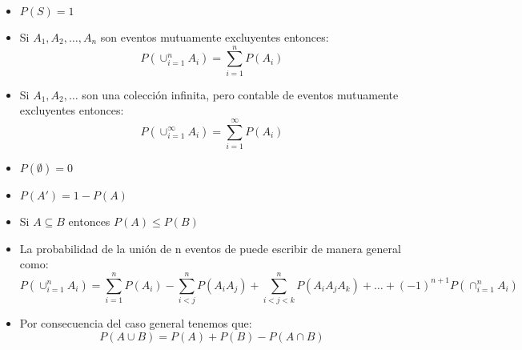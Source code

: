 \documentclass[12pt, fleqn]{report}                             %
\theoremstyle{break}                                            %
\newcommand{\Wrap}[1]{\left( #1 \right)}                        %
\begin{document}
            \begin{itemize}
                \item
                    $P(S) = 1$
                
                \item
                    Si $A_1, A_2, \dots, A_n$ son eventos mutuamente excluyentes entonces:
                    \begin{equation*}
                        P\Wrap{\cup_{i = 1}^n A_i} 
                            = \sum_{i = 1}^n P(A_i)    
                    \end{equation*}
                
                \item
                    Si $A_1, A_2, \dots$ son una colección infinita, pero contable de eventos
                    mutuamente excluyentes entonces:
                    \begin{equation*}
                        P\Wrap{\cup_{i = 1}^\infty A_i} 
                            = \sum_{i = 1}^\infty P(A_i)    
                    \end{equation*}

                \item 
                    $P(\emptyset) = 0$
                
                \item 
                    $P(A') = 1 - P(A)$

                \item 
                    Si $A \subseteq B$ entonces $P(A) \leq P(B)$

                \item
                    La probabilidad de la unión de n eventos de puede escribir de manera general como:
                    \begin{equation*}
                        P\Wrap{\cup_{i = 1}^n A_i} 
                        = 
                            \sum_{i = 1}^n P(A_i) 
                            - \sum_{i < j}^n P(A_iA_j) 
                            + \sum_{i < j < k}^n P(A_iA_jA_k)
                            + \dots
                            + (-1)^{n+1} P\Wrap{\cap_{i = 1}^n A_i}
                    \end{equation*}
                
                \item Por consecuencia del caso general tenemos que: 
                    \begin{equation*}
                        P(A \cup B) = P(A) + P(B) - P(A \cap B)   
                    \end{equation*}
                

\end{itemize}
\end{document}
